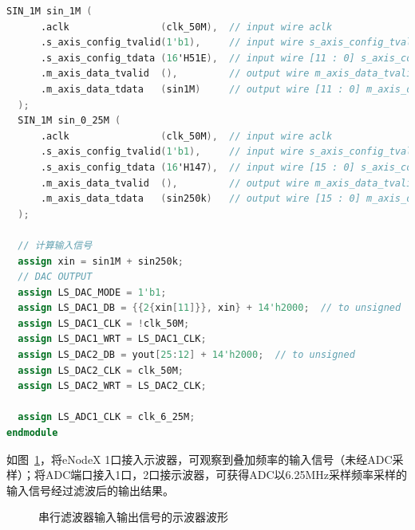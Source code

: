 \begin{lstlisting}[language=verilog,caption={TOP模块}]
  SIN_1M sin_1M (
      .aclk                (clk_50M),  // input wire aclk
      .s_axis_config_tvalid(1'b1),     // input wire s_axis_config_tvalid
      .s_axis_config_tdata (16'H51E),  // input wire [11 : 0] s_axis_config_tdata
      .m_axis_data_tvalid  (),         // output wire m_axis_data_tvalid
      .m_axis_data_tdata   (sin1M)     // output wire [11 : 0] m_axis_data_tdata
  );
  SIN_1M sin_0_25M (
      .aclk                (clk_50M),  // input wire aclk
      .s_axis_config_tvalid(1'b1),     // input wire s_axis_config_tvalid
      .s_axis_config_tdata (16'H147),  // input wire [15 : 0] s_axis_config_tdata
      .m_axis_data_tvalid  (),         // output wire m_axis_data_tvalid
      .m_axis_data_tdata   (sin250k)   // output wire [15 : 0] m_axis_data_tdata
  );

  // 计算输入信号
  assign xin = sin1M + sin250k;
  // DAC OUTPUT
  assign LS_DAC_MODE = 1'b1;
  assign LS_DAC1_DB = {{2{xin[11]}}, xin} + 14'h2000;  // to unsigned
  assign LS_DAC1_CLK = !clk_50M;
  assign LS_DAC1_WRT = LS_DAC1_CLK;
  assign LS_DAC2_DB = yout[25:12] + 14'h2000;  // to unsigned
  assign LS_DAC2_CLK = clk_50M;
  assign LS_DAC2_WRT = LS_DAC2_CLK;

  assign LS_ADC1_CLK = clk_6_25M;
endmodule

\end{lstlisting}

如图~\ref{fig:exp6:waveform}，将eNodeX 1口接入示波器，可观察到叠加频率的输入信号（未经ADC采样）；将ADC端口接入1口，2口接示波器，可获得ADC以6.25MHz采样频率采样的输入信号经过滤波后的输出结果。
\begin{figure}[htbp]
  \centering
  \hfill
  \caption{串行滤波器输入输出信号的示波器波形}
  \label{fig:exp6:waveform}
\end{figure}

